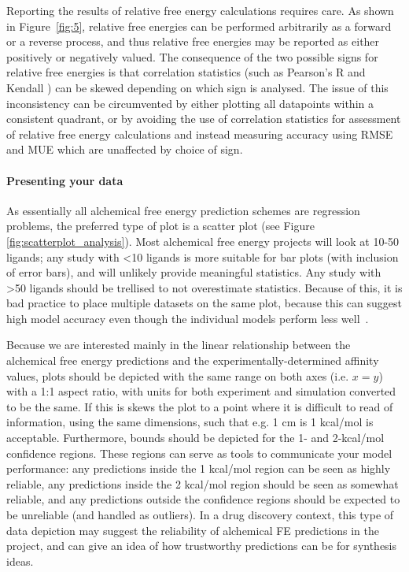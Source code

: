 \documentclass[9pt,bestpractices]{livecoms}
\begin{document}
Reporting the results of relative free energy calculations requires care. As shown in Figure~\ref{fig:5}, relative free energies can be performed arbitrarily as a forward or a reverse process, and thus relative free energies may be reported as either positively or negatively valued. The consequence of the two possible signs for relative free energies is that correlation statistics (such as Pearson's R and Kendall \texttau{}) can be skewed depending on which sign is analysed. The issue of this inconsistency can be circumvented by either plotting all datapoints within a consistent quadrant\cite{perez-benito2019predicting}, or by avoiding the use of correlation statistics for assessment of relative free energy calculations and instead measuring accuracy using RMSE and MUE which are unaffected by choice of sign.
%

\paragraph{Presenting your data}
As essentially all alchemical free energy prediction schemes are regression problems, the preferred type of plot is a scatter plot (see Figure \ref{fig:scatterplot_analysis}). Most alchemical free energy projects will look at 10-50 ligands; any study with \textless10 ligands is more suitable for bar plots (with inclusion of error bars), and will unlikely provide meaningful statistics. Any study with \textgreater50 ligands should be trellised to not overestimate statistics. Because of this, it is bad practice to place multiple datasets on the same plot, because this can suggest high model accuracy even though the individual models perform less well~\cite{walterthoughts}.
%

Because we are interested mainly in the linear relationship between the alchemical free energy predictions and the experimentally-determined affinity values, plots should be depicted with the same range on both axes (i.e. $x=y$) with a 1:1 aspect ratio, with units for both experiment and simulation converted to be the same. If this is skews the plot to a point where it is difficult to read of information, using the same dimensions, such that e.g. 1 cm is 1 kcal/mol is acceptable.  Furthermore, bounds should be depicted for the 1- and 2-kcal/mol confidence regions. These regions can serve as tools to communicate your model performance: any predictions inside the 1 kcal/mol region can be seen as highly reliable, any predictions inside the 2 kcal/mol region should be seen as somewhat reliable, and any predictions outside the confidence regions should be expected to be unreliable (and handled as outliers). In a drug discovery context, this type of data depiction may suggest the reliability of alchemical FE predictions in the project, and can give an idea of how trustworthy predictions can be for synthesis ideas. 
\end{document}
